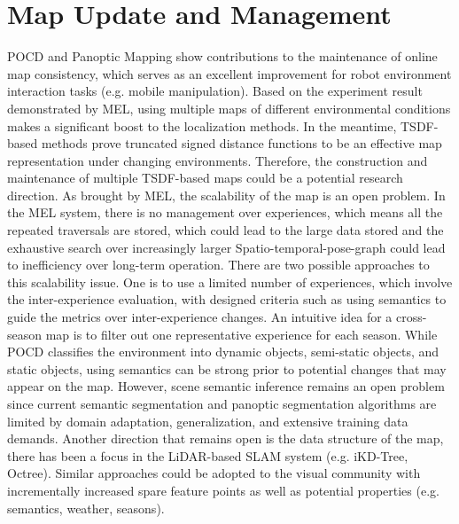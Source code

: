 \section{Map Update and Management}
POCD\cite{qian2022pocd} and Panoptic Mapping\cite{schmid2022panoptic} show contributions to the maintenance of online map consistency, which serves as an excellent improvement for robot environment interaction tasks (e.g. mobile manipulation). Based on the experiment result demonstrated by MEL\cite{paton2016bridging}, using multiple maps of different environmental conditions makes a significant boost to the localization methods. In the meantime, TSDF-based methods\cite{fehr2017tsdf,grinvald2021tsdf} prove truncated signed distance functions to be an effective map representation under changing environments. Therefore, the construction and maintenance of multiple TSDF-based maps could be a potential research direction. As brought by MEL, the scalability of the map is an open problem. In the MEL system, there is no management over experiences, which means all the repeated traversals are stored, which could lead to the large data stored and the exhaustive search over increasingly larger Spatio-temporal-pose-graph could lead to inefficiency over long-term operation. There are two possible approaches to this scalability issue. One is to use a limited number of experiences, which involve the 
inter-experience evaluation, with designed criteria such as using semantics to guide the metrics over inter-experience changes. An intuitive idea for a cross-season map is to filter out one representative experience for each season. While POCD classifies the environment into dynamic objects, semi-static objects, and static objects, using semantics can be strong prior to potential changes that may appear on the map. However, scene semantic inference remains an open problem since current semantic segmentation and panoptic segmentation algorithms are limited by domain adaptation, generalization, and extensive training data demands. Another direction that remains open is the data structure of the map, there has been a focus in the LiDAR-based SLAM system (e.g. iKD-Tree\cite{cai2021ikd}, Octree\cite{hornung2013octomap}). Similar approaches could be adopted to the visual community with incrementally increased spare feature points as well as potential properties (e.g. semantics, weather, seasons).
